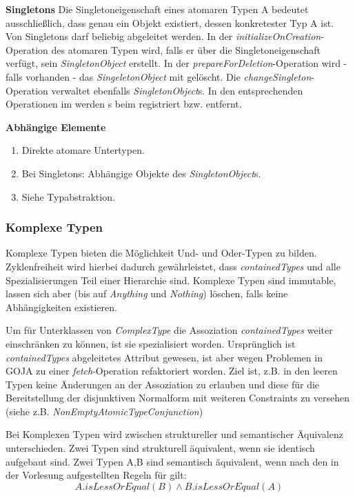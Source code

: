 \textbf{Singletons} \newline
Die Singletoneigenschaft eines atomaren Typen A bedeutet ausschließlich, dass genau ein Objekt existiert, dessen konkretester Typ A ist.
Von Singletons darf beliebig abgeleitet werden. 
In der \emph{initializeOnCreation}-Operation des atomaren Typen wird, falls er über die Singletoneigenschaft verfügt, 
sein \emph{SingletonObject} erstellt. In der \emph{prepareForDeletion}-Operation wird - falls vorhanden - das \emph{SingeletonObject}
mit gelöscht. Die \emph{changeSingleton}-Operation verwaltet ebenfalls \emph{SingletonObject}s. In den entsprechenden Operationen im 
 werden s beim  registriert bzw. entfernt.
 
\newpage
\textbf{Abhängige Elemente}
\begin{enumerate}
  		\item Direkte atomare Untertypen.
  		\item Bei Singletons: Abhängige Objekte des \emph{SingletonObject}s.
  		\item Siehe Typabstraktion.
\end{enumerate}

\subsubsection{Komplexe Typen}

Komplexe Typen bieten die Möglichkeit Und- und Oder-Typen zu bilden. Zyklenfreiheit wird hierbei dadurch gewährleistet, 
dass \emph{containedTypes} und alle Spezialisierungen Teil einer Hierarchie sind. Komplexe Typen sind immutable,
lassen sich aber (bis auf \emph{Anything} und \emph{Nothing}) löschen, falls keine Abhängigkeiten existieren.


Um für Unterklassen von \emph{ComplexType} die Assoziation \emph{containedTypes} weiter einschränken zu 
können, ist sie spezialisiert worden. Ursprünglich ist \emph{containedTypes} abgeleitetes Attribut gewesen,
ist aber wegen Problemen in GOJA zu einer \emph{fetch}-Operation refaktoriert worden. 
Ziel ist, z.B. in den leeren Typen keine Änderungen an der Assoziation zu erlauben und diese für die Bereitstellung 
der disjunktiven Normalform mit weiteren Constraints zu versehen (siehe z.B. \emph{NonEmptyAtomicTypeConjunction}) 

Bei Komplexen Typen wird zwischen struktureller und semantischer Äquivalenz unterschieden. Zwei Typen sind strukturell 
äquivalent, wenn sie identisch aufgebaut sind. Zwei Typen A,B sind semantisch äquivalent, wenn nach den in der Vorlesung 
aufgestellten Regeln für  gilt: 
\begin{equation}A.isLessOrEqual(B) \land B.isLessOrEqual(A)
\end{equation}

